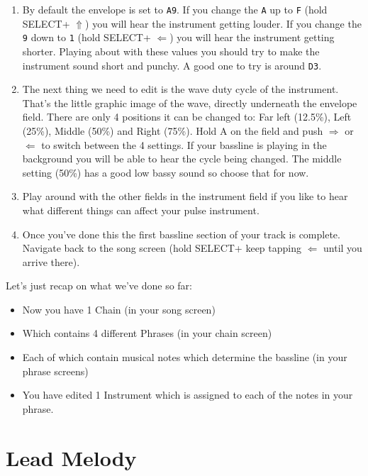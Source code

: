 \documentclass[]{article}
\newcommand{\buttonStyle}[1]{\textsf{#1}\xspace}
\newcommand{\buttonSymbolStyle}[1]{$\bm{#1}$\xspace}
\newcommand{\bA}{\buttonStyle{A}}
\newcommand{\bSelect}{\buttonStyle{{SELECT}}}
\newcommand{\bRight}{\buttonSymbolStyle{\Rightarrow}}
\newcommand{\bLeft}{\buttonSymbolStyle{\Leftarrow}}
\newcommand{\bUp}{\buttonSymbolStyle{\Uparrow}}
\newcommand{\nb}[1]{\texttt{#1}\xspace}
\begin{document}
\begin{enumerate}[resume]

\item By default the envelope is set to \nb{A9}. If you change the \nb{A} up to \nb{F} (hold \bSelect + \bUp) you will hear the instrument getting louder. If you change the \nb{9} down to \nb{1} (hold \bSelect + \bLeft) you will hear the instrument getting shorter. Playing about with these values you should try to make the instrument sound short and punchy. A good one to try is around \nb{D3}.

\item  The next thing we need to edit is the wave duty cycle of the instrument. That's the little graphic image of the wave, directly underneath the envelope field. There are only 4 positions it can be changed to: Far left (12.5\%), Left (25\%), Middle (50\%) and Right (75\%). 
Hold \bA on the field and push \bRight or \bLeft to switch between the 4 settings. If your bassline is playing in the background you will be able to hear the cycle being changed. The middle setting (50\%) has a good low bassy sound so choose that for now.

\item Play around with the other fields in the instrument field if you like to hear what different things can affect your pulse instrument.

\item Once you've done this the first bassline section of your track is complete. Navigate back to the song screen (hold \bSelect + keep tapping \bLeft until you arrive there).


\end{enumerate}

Let's just recap on what we've done so far: 
\begin{itemize}
	\item Now you have 1 Chain (in your song screen)
	\item  Which contains 4 different Phrases (in your chain screen) 
	\item Each of which contain musical notes which determine the bassline (in your phrase screens)
	\item  You have edited 1 Instrument which is assigned to each of the notes in your phrase.
	
\end{itemize}



\section{Lead Melody}
\end{document}
